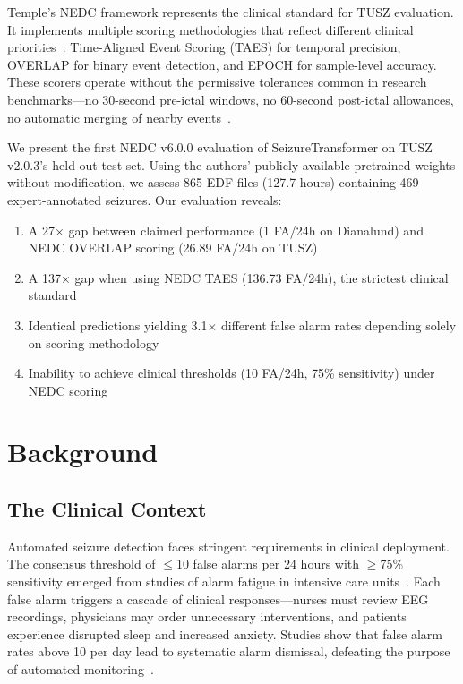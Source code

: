 \documentclass[10pt,a4paper]{article}
\begin{document}
Temple's NEDC framework represents the clinical standard for TUSZ evaluation. It implements multiple scoring methodologies that reflect different clinical priorities~\cite{shah2021nedc}: Time-Aligned Event Scoring (TAES) for temporal precision, OVERLAP for binary event detection, and EPOCH for sample-level accuracy. These scorers operate without the permissive tolerances common in research benchmarks---no 30-second pre-ictal windows, no 60-second post-ictal allowances, no automatic merging of nearby events~\cite{jing2020development}.

We present the first NEDC v6.0.0 evaluation of SeizureTransformer on TUSZ v2.0.3's held-out test set. Using the authors' publicly available pretrained weights without modification, we assess 865 EDF files (127.7 hours) containing 469 expert-annotated seizures. Our evaluation reveals:

\begin{enumerate}
    \item A 27$\times$ gap between claimed performance (1 FA/24h on Dianalund) and NEDC OVERLAP scoring (26.89 FA/24h on TUSZ)
    \item A 137$\times$ gap when using NEDC TAES (136.73 FA/24h), the strictest clinical standard
    \item Identical predictions yielding 3.1$\times$ different false alarm rates depending solely on scoring methodology
    \item Inability to achieve clinical thresholds (10 FA/24h, 75\% sensitivity) under NEDC scoring
\end{enumerate}

\section{Background}

\subsection{The Clinical Context}

Automated seizure detection faces stringent requirements in clinical deployment. The consensus threshold of $\leq$10 false alarms per 24 hours with $\geq$75\% sensitivity emerged from studies of alarm fatigue in intensive care units~\cite{schmid2022icunurse}. Each false alarm triggers a cascade of clinical responses---nurses must review EEG recordings, physicians may order unnecessary interventions, and patients experience disrupted sleep and increased anxiety. Studies show that false alarm rates above 10 per day lead to systematic alarm dismissal, defeating the purpose of automated monitoring~\cite{schmid2022icunurse}.
\end{document}
